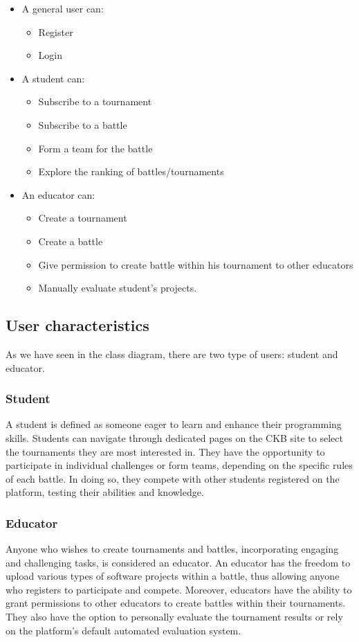 \begin{itemize}
    \item A general user can:
    \begin{itemize}
        \item Register
         \item Login
    \end{itemize}
\item A student can:
    \begin{itemize}
    \item Subscribe to a tournament
    \item Subscribe to a battle
    \item Form a team for the battle
    \item Explore the ranking of battles/tournaments
    \end{itemize}
\item  An educator can:
\begin{itemize}
    \item Create a tournament
    \item Create a battle
    \item Give permission to create battle within his tournament to other educators
    \item Manually evaluate student's projects.
\end{itemize}
\end{itemize}
\subsection{User characteristics}
As we have seen in the class diagram, there are two type of users: student and educator.
\subsubsection{Student}
A student is defined as someone eager to learn and enhance their programming skills. Students can navigate through dedicated pages on the CKB site to select the tournaments they are most interested in. They have the opportunity to participate in individual challenges or form teams, depending on the specific rules of each battle. In doing so, they compete with other students registered on the platform, testing their abilities and knowledge.
\subsubsection{Educator}
Anyone who wishes to create tournaments and battles, incorporating engaging and challenging tasks, is considered an educator. An educator has the freedom to upload various types of software projects within a battle, thus allowing anyone who registers to participate and compete. Moreover, educators have the ability to grant permissions to other educators to create battles within their tournaments. They also have the option to personally evaluate the tournament results or rely on the platform's default automated evaluation system.

